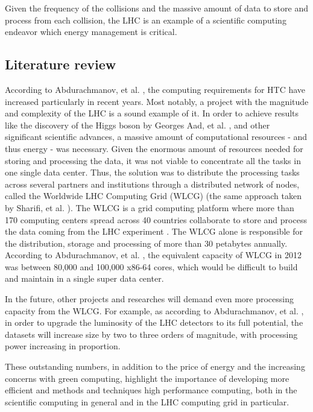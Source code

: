 Given the frequency of the collisions and the massive amount of
data to store and process from each collision, the LHC is an example of a scientific
computing endeavor which energy management is critical.  


\subsection*{Literature review}

According to Abdurachmanov, et al. \cite{ACAT13ARM}, the computing requirements for HTC have increased 
particularly in recent years. Most notably, a project with the magnitude and complexity of the 
LHC is a sound example of it. In order to achieve results like the discovery of
the Higgs boson by Georges Aad, et al. \cite{HIGGS1}, \cite{HIGGS2} and other significant scientific
advances, a massive amount of computational resources - and thus energy - was
necessary. Given the enormous amount of resources needed for storing and
processing the data, it was not viable to concentrate all the tasks in one
single data center. Thus, the solution was to distribute the processing tasks across 
several partners and institutions through a distributed network of nodes, called
the Worldwide LHC Computing Grid (WLCG) (the same approach taken by Sharifi, et al. \cite{ENERGY_DILEMMA}). The WLCG is a grid
computing platform where more than 170 computing centers spread across 40
countries collaborate to store and process the data coming from the
LHC experiment \cite{WLCG}. The WLCG alone is responsible for the distribution, 
storage and processing of more than 30 petabytes annually. According to Abdurachmanov, et al. 
\cite{ACAT13ARM}, the equivalent capacity of WLCG in 2012 was between 80,000 and 100,000 x86-64 cores, which would be difficult to build and maintain in a single super data center.

In the future, other projects and researches will demand even more processing capacity from
the WLCG. For example, as according to Abdurachmanov, et al. \cite{ACAT13ARM}, in order to upgrade the
luminosity of the LHC detectors to its full potential, the datasets will
increase size by two to three orders of magnitude, with processing power
increasing in proportion.

These outstanding numbers, in addition to the price of energy and the increasing
concerns with green computing, highlight the importance of
developing more efficient and methods and techniques high performance computing,
both in the scientific computing in general and in the LHC computing grid in
particular. 

